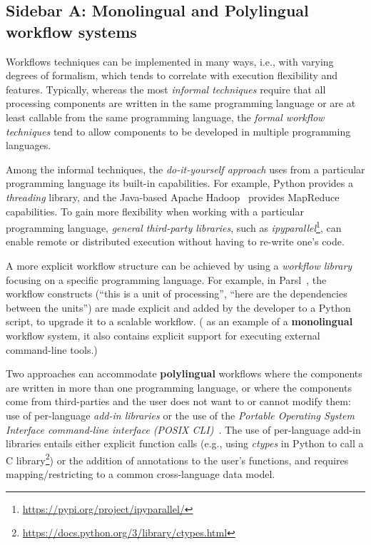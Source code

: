\documentclass[sigconf,authordraft]{acmart}
\begin{document}

\subsection{Sidebar A: Monolingual and Polylingual workflow systems} \label{sec:sidebar:a}

Workflows techniques can be implemented in many ways, i.e., with varying degrees of formalism, which tends to correlate with execution flexibility and features. Typically, whereas the most \textit{informal techniques} require that all processing components are written in the same programming language or are at least callable from the same programming language, the \textit{formal workflow techniques} tend to allow components to be developed in multiple programming languages. 

Among the informal techniques, the \textit{do-it-yourself approach} uses from a particular programming language its built-in capabilities. For example, Python provides a \emph{threading} library, and the Java-based Apache Hadoop~\cite{taylor_overview_2010} provides MapReduce capabilities. To gain more flexibility when working with a particular programming language, \textit{general third-party libraries}, such as \emph{ipyparallel}\footnote{\url{https://pypi.org/project/ipyparallel/}}, can enable remote or distributed execution without having to re-write one's code.

A more explicit workflow structure can be achieved by using a \textit{workflow library} focusing on a specific programming language. For example, in Parsl~\cite{babuji_parsl_2019}, the workflow constructs (``this is a unit of processing'', ``here are the dependencies between the units'') are made explicit and added by the developer to a Python script, to upgrade it to a scalable workflow. ( as an example of a \textbf{monolingual} workflow system,  it also contains explicit support for executing external command-line tools.)

Two approaches can accommodate \textbf{polylingual} workflows where the components are written in more than one programming language, or where the components come from third-parties and the user does not want to or cannot modify them: use of per-language \textit{add-in libraries} or the use of the \textit{Portable Operating System Interface command-line interface (POSIX CLI)}~\cite{the_austin_group_posix1-2008_2008}. The use of per-language add-in libraries entails either explicit function calls (e.g., using \emph{ctypes} in Python to call a C library\footnote{\url{https://docs.python.org/3/library/ctypes.html}}) or the addition of annotations to the user's functions, and requires mapping/restricting to a common cross-language data model.
\end{document}
